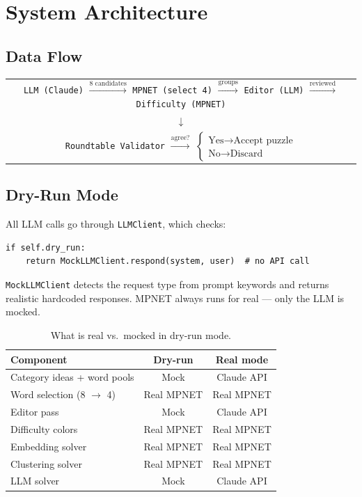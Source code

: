 \documentclass[11pt, letterpaper]{article}
\begin{document}
\section{System Architecture}

\subsection{Data Flow}

\begin{center}
\begin{tabular}{@{}c@{}}
\texttt{LLM (Claude)} $\xrightarrow{\text{8 candidates}}$
\texttt{MPNET (select 4)} $\xrightarrow{\text{groups}}$
\texttt{Editor (LLM)} $\xrightarrow{\text{reviewed}}$
\texttt{Difficulty (MPNET)} \\[8pt]
$\downarrow$ \\[4pt]
\texttt{Roundtable Validator} $\xrightarrow{\text{agree?}}$
$\begin{cases} \text{Yes} \rightarrow \text{Accept puzzle} \\ \text{No} \rightarrow \text{Discard} \end{cases}$
\end{tabular}
\end{center}

\subsection{Dry-Run Mode}

All LLM calls go through \texttt{LLMClient}, which checks:
\begin{lstlisting}
if self.dry_run:
    return MockLLMClient.respond(system, user)  # no API call
\end{lstlisting}

\texttt{MockLLMClient} detects the request type from prompt keywords and returns realistic hardcoded responses. MPNET always runs for real --- only the LLM is mocked.

\begin{table}[H]
\centering
\caption{What is real vs.\ mocked in dry-run mode.}
\begin{tabular}{@{}lcc@{}}
\toprule
Component & Dry-run & Real mode \\
\midrule
Category ideas + word pools & Mock & Claude API \\
Word selection (8 $\to$ 4) & Real MPNET & Real MPNET \\
Editor pass & Mock & Claude API \\
Difficulty colors & Real MPNET & Real MPNET \\
Embedding solver & Real MPNET & Real MPNET \\
Clustering solver & Real MPNET & Real MPNET \\
LLM solver & Mock & Claude API \\
\bottomrule
\end{tabular}
\end{table}
\end{document}
